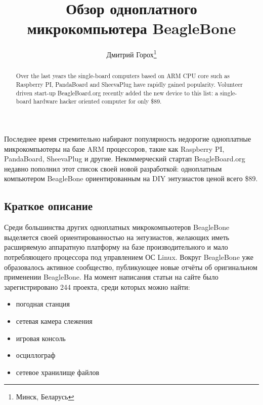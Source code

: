 \documentclass[10pt, a5paper]{article}
\begin{document}
\title{Обзор одноплатного микрокомпьютера BeagleBone}%

\author{Дмитрий Горох\footnote{Минск, Беларусь}}
\maketitle

\begin{abstract}
Over the last years the single-board computers based on ARM CPU core such as Raspberry PI, PandaBoard and SheevaPlug have rapidly gained popularity. Volunteer driven start-up \linebreak BeagleBoard.org recently added the new device to this list: a single-board hardware hacker oriented computer for only \$89.
\end{abstract}

Последнее время стремительно набирают популярность недорогие одноплатные микрокомпьютеры на базе ARM процессоров, такие как Raspberry PI, PandaBoard, SheevaPlug и другие. Некоммерческий стартап BeagleBoard.org недавно пополнил этот список своей новой разработкой: одноплатным компьютером BeagleBone ориентированным на DIY энтузиастов ценой всего \$89.

\subsection*{Краткое описание}



Среди большинства других одноплатных микрокомпьютеров \linebreak BeagleBone выделяется своей ориентированностью на энтузиастов, желающих иметь расширяемую аппаратную платформу на базе производительного и мало потребляющего процессора под управлением ОС Linux. Вокруг BeagleBone уже образовалось активное сообщество, публикующее новые отчёты об оригинальном применении BeagleBone. На момент написания статьи на сайте было зарегистрировано 244 проекта, среди которых можно найти:

\begin{itemize}
  \item погодная станция
  \item сетевая камера слежения
  \item игровая консоль
  \item осциллограф
  \item сетевое хранилище файлов
\end{itemize}
\end{document}
